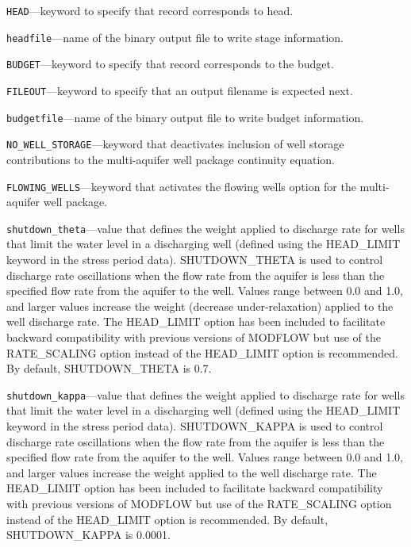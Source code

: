 \begin{description}
\item \texttt{HEAD}---keyword to specify that record corresponds to head.

\item \texttt{headfile}---name of the binary output file to write stage information.

\item \texttt{BUDGET}---keyword to specify that record corresponds to the budget.

\item \texttt{FILEOUT}---keyword to specify that an output filename is expected next.

\item \texttt{budgetfile}---name of the binary output file to write budget information.

\item \texttt{NO\_WELL\_STORAGE}---keyword that deactivates inclusion of well storage contributions to the multi-aquifer well package continuity equation.

\item \texttt{FLOWING\_WELLS}---keyword that activates the flowing wells option for the multi-aquifer well package.

\item \texttt{shutdown\_theta}---value that defines the weight applied to discharge rate for wells that limit the water level in a discharging well (defined using the HEAD\_LIMIT keyword in the stress period data). SHUTDOWN\_THETA is used to control discharge rate oscillations when the flow rate from the aquifer is less than the specified flow rate from the aquifer to the well. Values range between 0.0 and 1.0, and larger values increase the weight (decrease under-relaxation) applied to the well discharge rate. The HEAD\_LIMIT option has been included to facilitate backward compatibility with previous versions of MODFLOW but use of the RATE\_SCALING option instead of the HEAD\_LIMIT option is recommended. By default, SHUTDOWN\_THETA is 0.7.

\item \texttt{shutdown\_kappa}---value that defines the weight applied to discharge rate for wells that limit the water level in a discharging well (defined using the HEAD\_LIMIT keyword in the stress period data). SHUTDOWN\_KAPPA is used to control discharge rate oscillations when the flow rate from the aquifer is less than the specified flow rate from the aquifer to the well. Values range between 0.0 and 1.0, and larger values increase the weight applied to the well discharge rate. The HEAD\_LIMIT option has been included to facilitate backward compatibility with previous versions of MODFLOW but use of the RATE\_SCALING option instead of the HEAD\_LIMIT option is recommended. By default, SHUTDOWN\_KAPPA is 0.0001.


\end{description}
